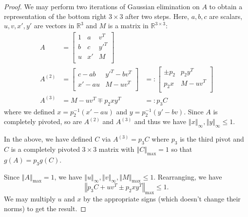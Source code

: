 \documentclass[10pt,a4paper]{amsart}
\newcommand\R{\mathbb{R}}
\newcommand{\norm}[1]{\left\Vert #1 \right\Vert}
\begin{document}
\begin{proof}
    We may perform two iterations of Gaussian elimination on $A$ to obtain a representation of the bottom right $3 \times 3$ after two steps. Here, $a,b,c$ are scalars, $u,v,x',y'$ are vectors in $\R^3$ and $M$ is a matrix in $\R^{3 \times 3}$:
    \begin{align}
        A &= \begin{bmatrix}
            1 & a & v^T\\
            b & c & y'^T \\
            u & x' & M\\
        \end{bmatrix} \\ 
        A^{(2)} &= \begin{bmatrix}
            c-ab & y'^T - bv^T\\
            x'-au & M - uv^T\\
        \end{bmatrix} &=:
        \begin{bmatrix}
            \pm p_2 & p_2 y^T\\
            p_2 x & M - uv^T\\
        \end{bmatrix} \\
        A^{(3)} &= 
            M - uv^T \mp p_2 xy^T
         &=: p_3 C
    \end{align}
    where we defined $x = p_2^{-1}(x'-au)$ and $y = p_2^{-1}(y'-bv)$. Since $A$ is completely pivoted, so are $A^{(2)}$ and $A^{(3)}$ and thus we have $\norm{x}_\infty, \norm{y}_\infty \leq 1$.

    In the above, we have defined $C$ via $A^{(3)} = p_3 C$ where $p_3$ is the third pivot and $C$ is a completely pivoted $3 \times 3$ matrix with $\norm{C}_{\max} = 1$ so that $g(A) = p_3 g(C)$.

    Since $\norm{A}_{\max} = 1$, we have $\norm{u}_\infty, \norm{v}_\infty, \norm{M}_{\max} \leq 1$. Rearranging, we have 
    \begin{equation}
        \norm{p_3 C + uv^T \pm p_2 xy^T}_{\max} \leq 1.
    \end{equation}
    We may multiply $u$ and $x$ by the appropriate signs (which doesn't change their norms) to get the result.
\end{proof}
\end{document}
